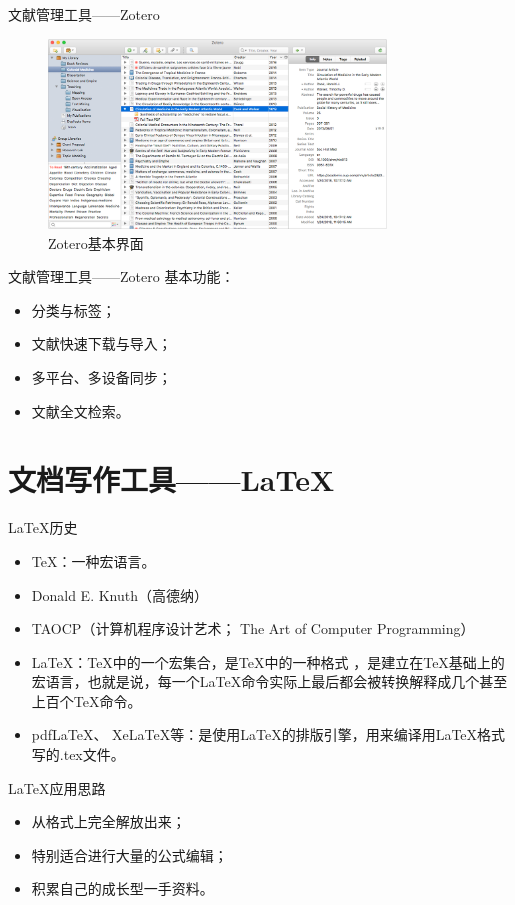 \documentclass[xcolor=x11names,compress,10pt]{ctexbeamer}
\begin{document}
\begin{frame}{文献管理工具——Zotero}
\begin{figure}[h!]
\centering
\includegraphics[width=0.8\textwidth]{pictures/zotero.png}
\caption{Zotero基本界面}
\end{figure}
\end{frame}


\begin{frame}{文献管理工具——Zotero}
基本功能：
\begin{itemize}
\item 分类与标签；
\item 文献快速下载与导入；
\item 多平台、多设备同步；
\item 文献全文检索。
\end{itemize}
\end{frame}


\section[\LaTeX]{文档写作工具——\LaTeX}
\begin{frame}{\LaTeX 历史}
\begin{itemize}
\item \TeX：一种宏语言。
\item Donald E. Knuth（高德纳）
\item TAOCP（计算机程序设计艺术； The Art of Computer Programming）
\item \LaTeX：\TeX 中的一个宏集合，是\TeX 中的一种格式 ，是建立在\TeX 基础上的宏语言，也就是说，每一个\LaTeX 命令实际上最后都会被转换解释成几个甚至上百个\TeX 命令。
\item pdf\LaTeX、 Xe\LaTeX 等：是使用\LaTeX 的排版引擎，用来编译用\LaTeX 格式写的.tex文件。
\end{itemize}
\end{frame}

\begin{frame}{\LaTeX 应用思路}
\begin{itemize}
\item 从格式上完全解放出来；
\item 特别适合进行大量的公式编辑；
\item 积累自己的成长型一手资料。
\end{itemize}
\end{frame}
\end{document}
